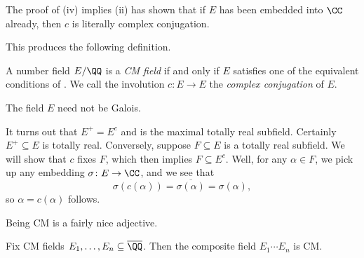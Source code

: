 \documentclass[../notes.tex]{subfiles}
\begin{document}
\begin{remark} \label{rem:complex-conj-of-cm}
	The proof of (iv) implies (ii) has shown that if $E$ has been embedded into $\CC$ already, then $c$ is literally complex conjugation.
\end{remark}
This produces the following definition.
\begin{definition}[CM field]
	A number field $E/\QQ$ is a \textit{CM field} if and only if $E$ satisfies one of the equivalent conditions of . We call the involution $c\colon E\to E$ the \textit{complex conjugation} of $E$.
\end{definition}
\begin{remark}
	The field $E$ need not be Galois.
\end{remark}
\begin{remark}
	It turns out that $E^+=E^c$ and is the maximal totally real subfield. Certainly $E^+\subseteq E$ is totally real. Conversely, suppose $F\subseteq E$ is a totally real subfield. We will show that $c$ fixes $F$, which then implies $F\subseteq E^c$. Well, for any $\alpha\in F$, we pick up any embedding $\sigma\colon E\to\CC$, and we see that
	\[\sigma(c(\alpha))=\overline{\sigma(\alpha)}=\sigma(\alpha),\]
	so $\alpha=c(\alpha)$ follows.
\end{remark}
Being CM is a fairly nice adjective.
\begin{lemma} \label{lem:comp-cm}
	Fix CM fields $E_1,\ldots,E_n\subseteq\overline\QQ$. Then the composite field $E_1\cdots E_n$ is CM.
\end{lemma}
\end{document}
